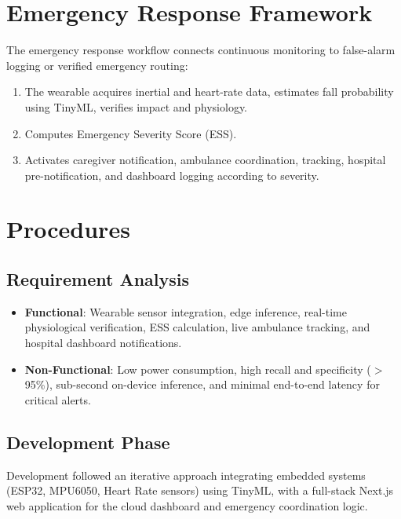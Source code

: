 \section[Emergency Response Framework]{\textbf{Emergency Response Framework}}

The emergency response workflow connects continuous monitoring to false-alarm logging or verified emergency routing:
\begin{enumerate}
\item The wearable acquires inertial and heart-rate data, estimates fall probability using TinyML, verifies impact and physiology.
\item Computes Emergency Severity Score (ESS).
\item Activates caregiver notification, ambulance coordination, tracking, hospital pre-notification, and dashboard logging according to severity.
\end{enumerate}

\section[Procedures]{\textbf{Procedures}}

\subsection{Requirement Analysis}

\begin{itemize}
\item \textbf{Functional}: Wearable sensor integration, edge inference, real-time physiological verification, ESS calculation, live ambulance tracking, and hospital dashboard notifications.
\item \textbf{Non-Functional}: Low power consumption, high recall and specificity ($>$95\%), sub-second on-device inference, and minimal end-to-end latency for critical alerts.
\end{itemize}

\subsection{Development Phase}

Development followed an iterative approach integrating embedded systems (ESP32, MPU6050, Heart Rate sensors) using TinyML, with a full-stack Next.js web application for the cloud dashboard and emergency coordination logic.
